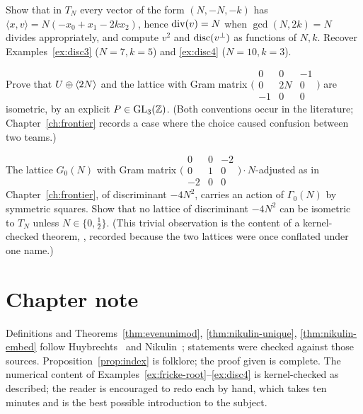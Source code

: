 \begin{exercise}[$\star$]
Show that in $T_N$ every vector of the form $(N,-N,-k)$ has
$\langle x,v\rangle=N(-x_0+x_1-2kx_2)$, hence $\operatorname{div}(v)=N$ when $\gcd(N,2k)=N$
divides appropriately, and compute $v^2$ and $\operatorname{disc}(v^{\perp})$ as functions
of $N,k$. Recover Examples~\ref{ex:disc3} ($N=7,k=5$) and \ref{ex:disc4}
($N=10,k=3$).
\end{exercise}

\begin{exercise}
Prove that $U\oplus\langle 2N\rangle$ and the lattice with Gram matrix
$\bigl(\begin{smallmatrix}0&0&-1\\0&2N&0\\-1&0&0\end{smallmatrix}\bigr)$
are isometric, by an explicit $P\in\operatorname{GL}_3(\mathbb{Z})$. (Both conventions occur in the
literature; Chapter~\ref{ch:frontier} records a case where the choice caused
confusion between two teams.)
\end{exercise}

\begin{exercise}
The lattice $G_0(N)$ with Gram matrix $\bigl(\begin{smallmatrix}0&0&-2\\0&1&0\\-2&0&0\end{smallmatrix}\bigr)\cdot N$-adjusted as in
Chapter~\ref{ch:frontier}, of discriminant $-4N^2$, carries an action of
$\Gamma_0(N)$ by symmetric squares. Show that no lattice of discriminant
$-4N^2$ can be isometric to $T_N$ unless $N\in\{0,\tfrac12\}$. (This trivial
observation is the content of a kernel-checked theorem,
, recorded because the two lattices were once
conflated under one name.)
\end{exercise}

\section*{Chapter note}

Definitions and Theorems~\ref{thm:evenunimod}, \ref{thm:nikulin-unique},
\ref{thm:nikulin-embed} follow Huybrechts~\cite[Ch.~14]{Huybrechts2016} and
Nikulin~\cite{Nikulin1979}; statements were checked against those sources.
Proposition~\ref{prop:index} is folklore; the proof given is complete. The
numerical content of Examples~\ref{ex:fricke-root}--\ref{ex:disc4} is
kernel-checked as described; the reader is encouraged to redo each by hand,
which takes ten minutes and is the best possible introduction to the subject.
